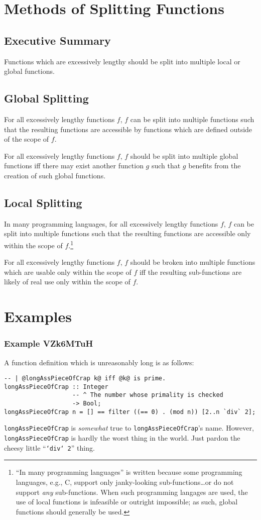 \documentclass{report}
\begin{document}
\section{Methods of Splitting Functions}
\subsection{Executive Summary}
Functions which are excessively lengthy should be split into multiple local or global functions.
\subsection{Global Splitting}
For all excessively lengthy functions $f$, $f$ can be split into multiple functions such that the resulting functions are accessible by functions which are defined outside of the scope of $f$.

For all excessively lengthy functions $f$, $f$ should be split into multiple global functions iff there may exist another function $g$ such that $g$ benefits from the creation of such global functions.
\subsection{Local Splitting}
In many programming languages, for all excessively lengthy functions $f$, $f$ can be split into multiple functions such that the resulting functions are accessible only within the scope of $f$.\footnote{``In many programming languages'' is written because some programming languages, e.g., C, support only janky-looking sub-functions\ldots or do not support \textit{any} sub-functions.  When such programming langages are used, the use of local functions is infeasible or outright impossible; as such, global functions should generally be used.}

For all excessively lengthy functions $f$, $f$ should be broken into multiple functions which are usable only within the scope of $f$ iff the resulting sub-functions are likely of real use only within the scope of $f$.
\section{Examples}
\subsubsection{Example VZk6MTuH}
A function definition which is unreasonably long is as follows:
\begin{lstlisting}
-- | @longAssPieceOfCrap k@ iff @k@ is prime.
longAssPieceOfCrap :: Integer
                   -- ^ The number whose primality is checked
                   -> Bool;
longAssPieceOfCrap n = [] == filter ((== 0) . (mod n)) [2..n `div` 2];
\end{lstlisting}
\texttt{longAssPieceOfCrap} is \textit{somewhat} true to \texttt{longAssPieceOfCrap}'s name.  However, \texttt{longAssPieceOfCrap} is hardly the worst thing in the world.  Just pardon the cheesy little ``\texttt{`div` 2}'' thing.
\end{document}
